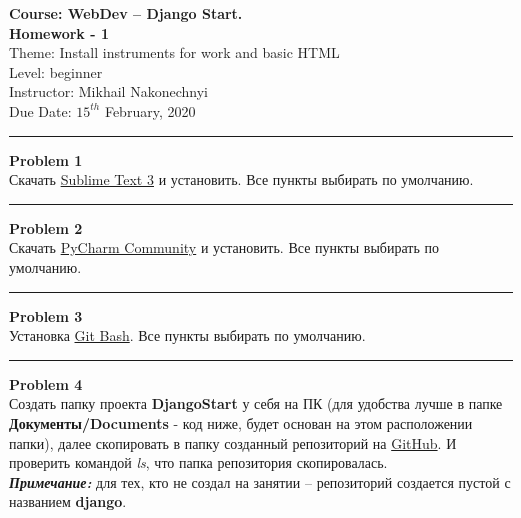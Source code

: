 \documentclass[a4paper, 11pt]{extarticle}
\newenvironment{problem}[2][Problem]
    { \begin{mdframed}[backgroundcolor=gray!20] \textbf{#1 #2} \\}
    {  \end{mdframed}}
\begin{document}

\noindent \LARGE{\textbf{Course: WebDev -- Django Start.}} \hfill  \\ 
\textbf{Homework - 1}  \hfill  \\

\noindent Theme: Install instruments for work and basic HTML\hfill  \\
Level: beginner\\
Instructor: Mikhail Nakonechnyi \\
Due Date: $15^{th}$ February, 2020 \\
\noindent\rule{6.257in}{2.8pt}

\begin{problem}{1}
Скачать \href{https://www.sublimetext.com/3}{Sublime Text 3} и установить. Все пункты выбирать по умолчанию.
\end{problem}

\noindent\rule{6.257in}{2.8pt}



\begin{problem}{2}
Скачать \href{https://www.jetbrains.com/pycharm/download/#section=windows}{PyCharm Community} и установить. Все пункты выбирать по умолчанию.
\end{problem}

\noindent\rule{6.257in}{2.8pt}


\begin{problem}{3}
Установка \href{https://git-scm.com/downloads}{Git Bash}. Все пункты выбирать по умолчанию.
\end{problem}

\noindent\rule{6.257in}{2.8pt}




\begin{problem}{4}
Создать папку проекта \textbf{DjangoStart} у себя на ПК (для удобства лучше в папке \textbf{Документы/Documents} - код ниже, будет основан на этом расположении папки), далее скопировать в папку созданный репозиторий на \href{https://github.com/}{GitHub}. И проверить командой \textit{ls}, что папка репозитория скопировалась.\\

\textit{\textbf{Примечание: }} для тех, кто не создал на занятии -- репозиторий создается пустой с названием \textbf{django}. 
\end{problem}
\end{document}
